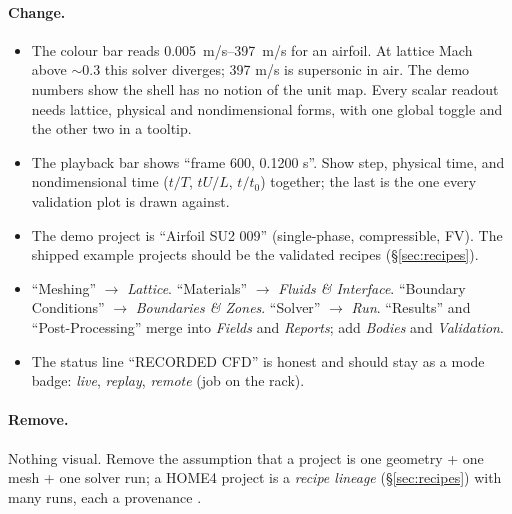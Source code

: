\documentclass[11pt,a4paper]{article}
\begin{document}
\paragraph{Change.}
\begin{itemize}
\item The colour bar reads \qtyrange{0.005}{397}{m/s} for an airfoil. At lattice
  Mach above $\sim$0.3 this solver diverges; 397 m/s is supersonic in air. The demo
  numbers show the shell has no notion of the unit map. Every scalar readout needs
  lattice, physical and nondimensional forms, with one global toggle and the other
  two in a tooltip.
\item The playback bar shows ``frame 600, 0.1200 s''. Show step, physical time, and
  nondimensional time ($t/T$, $tU/L$, $t/t_0$) together; the last is the one every
  validation plot is drawn against.
\item The demo project is ``Airfoil SU2 009'' (single-phase, compressible, FV). The
  shipped example projects should be the validated recipes (\S\ref{sec:recipes}).
\item ``Meshing'' $\to$ \emph{Lattice}. ``Materials'' $\to$ \emph{Fluids \& Interface}.
  ``Boundary Conditions'' $\to$ \emph{Boundaries \& Zones}. ``Solver'' $\to$
  \emph{Run}. ``Results'' and ``Post-Processing'' merge into \emph{Fields} and
  \emph{Reports}; add \emph{Bodies} and \emph{Validation}.
\item The status line ``RECORDED CFD'' is honest and should stay as a mode badge:
  \emph{live}, \emph{replay}, \emph{remote} (job on the rack).
\end{itemize}

\paragraph{Remove.} Nothing visual. Remove the assumption that a project is one
geometry + one mesh + one solver run; a HOME4 project is a \emph{recipe lineage}
(\S\ref{sec:recipes}) with many runs, each a provenance .

\end{document}
